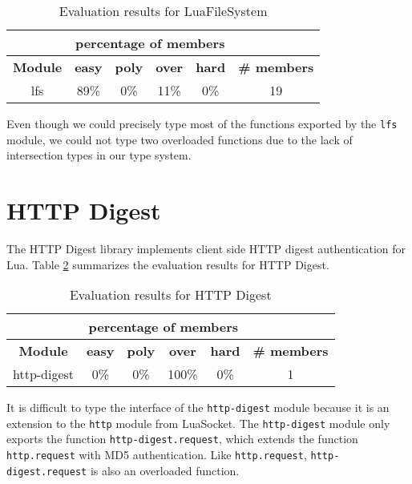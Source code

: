 \begin{table}[!ht]
\begin{center}
\begin{tabular}{|c|c|c|c|c|c|}
\cline{2-5}
\multicolumn{1}{c}{} & \multicolumn{4}{|c|}{percentage of members} & \multicolumn{1}{c}{} \\
\hline
\textbf{Module} & \textbf{easy} & \textbf{poly} & \textbf{over} & \textbf{hard} & \textbf{\# members} \\
\hline
lfs & 89\% & 0\% & 11\% & 0\% & 19 \\ %
\hline
\end{tabular}
\end{center}
\caption{Evaluation results for LuaFileSystem}
\label{tab:evallfs}
\end{table}

Even though we could precisely type most of the functions exported
by the \texttt{lfs} module, we could not type two overloaded functions
due to the lack of intersection types in our type system.

\section{HTTP Digest}

The HTTP Digest library implements client side HTTP digest authentication for Lua.
Table \ref{tab:evalhttpdigest} summarizes the evaluation results for HTTP Digest.

\begin{table}[!ht]
\begin{center}
\begin{tabular}{|c|c|c|c|c|c|}
\cline{2-5}
\multicolumn{1}{c}{} & \multicolumn{4}{|c|}{percentage of members} & \multicolumn{1}{c}{} \\
\hline
\textbf{Module} & \textbf{easy} & \textbf{poly} & \textbf{over} & \textbf{hard} & \textbf{\# members} \\
\hline
http-digest & 0\% & 0\% & 100\% & 0\% & 1 \\ %
\hline
\end{tabular}
\end{center}
\caption{Evaluation results for HTTP Digest}
\label{tab:evalhttpdigest}
\end{table}

It is difficult to type the interface of the \texttt{http-digest} module
because it is an extension to the \texttt{http} module from LuaSocket.
The \texttt{http-digest} module only exports the function
\texttt{http-digest.request}, which extends the function
\texttt{http.request} with MD5 authentication.
Like \texttt{http.request}, \texttt{http-digest.request}
is also an overloaded function.

